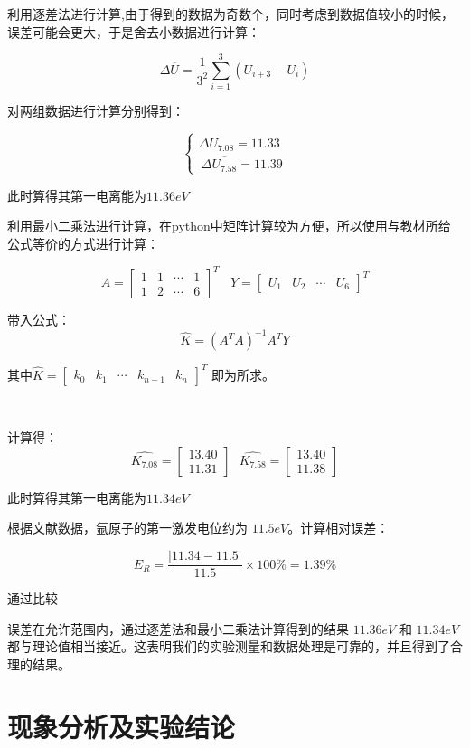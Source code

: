 \documentclass{ctexart}
\begin{document}
利用逐差法进行计算,由于得到的数据为奇数个，同时考虑到数据值较小的时候，误差可能会更大，于是舍去小数据进行计算：

$$
\Delta \overline{U} = \frac{1}{3^2} \sum_{i=1}^{3}(U_{i+3}-U_i)
$$

对两组数据进行计算分别得到：

$$
\left\{
\begin{aligned}
    \Delta \overline{U_{7.08}} = 11.33 \\ \
    \Delta \overline{U_{7.58}} = 11.39 
\end{aligned} 
\right.
$$

此时算得其第一电离能为$11.36eV$

利用最小二乘法进行计算，在python中矩阵计算较为方便，所以使用与教材所给公式等价的方式进行计算：


$$ 
A = {\begin{bmatrix}
    1 & 1 & \cdots & 1 \\
    1 & 2 & \cdots & 6 
 \end{bmatrix}}^T \ \ \ \
  Y = {\begin{bmatrix} U_1  & U_2 & \cdots & U_6 \end{bmatrix}}^T
$$

带入公式：
$$ 
\widehat{K} = {(A^T A)}^{-1} A^T Y 
$$

其中$ \widehat{K} = {\begin{bmatrix} k_0  & k_1 & \cdots & k_{n-1} & k_{n} \end{bmatrix}}^T $ 即为所求。

~

计算得：
$$\widehat{K_{7.08}} = \begin{bmatrix} 13.40 \\ 11.31 \end{bmatrix}  \ \ \ \widehat{K_{7.58}} = \begin{bmatrix} 13.40 \\ 11.38 \end{bmatrix}$$

此时算得其第一电离能为$11.34eV$

根据文献数据，氩原子的第一激发电位约为 $11.5 eV$。计算相对误差：

$$
E_R = \frac{|11.34-11.5|}{11.5} \times 100\% = 1.39\%
$$

通过比较

误差在允许范围内，通过逐差法和最小二乘法计算得到的结果 $11.36 eV$ 和 $11.34 eV$ 都与理论值相当接近。这表明我们的实验测量和数据处理是可靠的，并且得到了合理的结果。
\newpage

\section{现象分析及实验结论}
\end{document}
